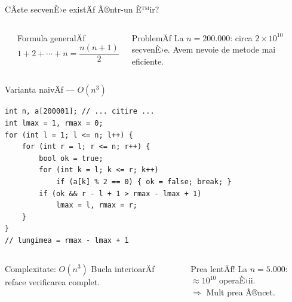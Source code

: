 \documentclass{beamer}
\begin{document}
\begin{frame}{CÃ¢te secvenÈ›e existÄƒ Ã®ntr-un È™ir?}
  \begin{columns}[T]
    \begin{center}
    \end{center}
    \begin{block}{Formula generalÄƒ}
      \[ 1 + 2 + \cdots + n = \frac{n(n+1)}{2} \]
    \end{block}
    \begin{alertblock}{ProblemÄƒ}
      La $n = 200{.}000$: circa $2 \times 10^{10}$ secvenÈ›e.
      Avem nevoie de metode mai eficiente.
    \end{alertblock}
  \end{columns}
\end{frame}

\begin{frame}{Varianta naivÄƒ --- $O(n^3)$}
  \begin{lstlisting}
int n, a[200001]; // ... citire ...
int lmax = 1, rmax = 0;
for (int l = 1; l <= n; l++) {
    for (int r = l; r <= n; r++) {
        bool ok = true;
        for (int k = l; k <= r; k++)
            if (a[k] % 2 == 0) { ok = false; break; }
        if (ok && r - l + 1 > rmax - lmax + 1)
            lmax = l, rmax = r;
    }
}
// lungimea = rmax - lmax + 1
  \end{lstlisting}
  \begin{columns}[T]
    \begin{block}{Complexitate: $O(n^3)$}
      Bucla interioarÄƒ reface verificarea complet.
    \end{block}
    \begin{alertblock}{Prea lentÄƒ!}
      La $n = 5{.}000$: $\approx 10^{10}$ operaÈ›ii.\\ $\Rightarrow$ Mult prea Ã®ncet.
    \end{alertblock}
  \end{columns}
\end{frame}
\end{document}
